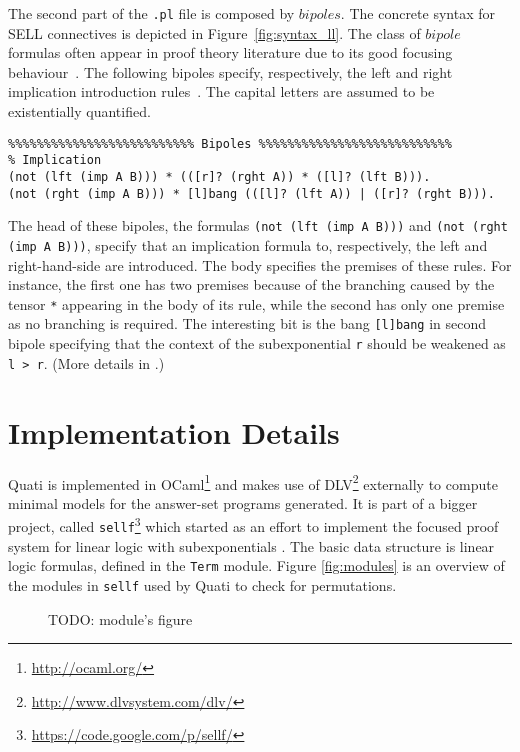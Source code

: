\documentclass{llncs}
\begin{document}
The second part of the \texttt{.pl} file is composed by $bipoles$. The concrete syntax for SELL connectives
is depicted in Figure~\ref{fig:syntax_ll}. The class of $bipole$ formulas often
appear in proof theory literature due to its good focusing
behaviour~\cite{andreoli}. The following bipoles specify, 
respectively, the left and right implication introduction rules~\cite{nigam.jlc}. The capital 
letters are assumed to be existentially quantified.

{\footnotesize
\begin{verbatim}
%%%%%%%%%%%%%%%%%%%%%%%%%% Bipoles %%%%%%%%%%%%%%%%%%%%%%%%%%%
% Implication
(not (lft (imp A B))) * (([r]? (rght A)) * ([l]? (lft B))).
(not (rght (imp A B))) * [l]bang (([l]? (lft A)) | ([r]? (rght B))).
\end{verbatim}
}

The head of these bipoles, the formulas \texttt{(not (lft (imp A B)))} and
\texttt{(not (rght (imp A B)))}, specify that an implication formula to, respectively, 
the left and right-hand-side are introduced. The body specifies the premises of these
rules. For instance, the first one has two premises because of the branching caused by the  
tensor \texttt{*} appearing in the body of its rule, while
the second has only one premise as no branching is required. 
The interesting bit is the bang \texttt{[l]bang} in second bipole specifying that the 
context of the subexponential \texttt{r} should be weakened as \texttt{l > r}. (More details
in \cite{nigam.jlc}.) 

\section{Implementation Details}

Quati is implemented in OCaml\footnote{\url{http://ocaml.org/}} and makes use of
DLV\footnote{\url{http://www.dlvsystem.com/dlv/}} externally to compute minimal models for the
answer-set programs generated. It is part of a bigger project, called
\texttt{sellf}\footnote{\url{https://code.google.com/p/sellf/}} which started as an effort to
implement the focused proof system for linear logic with subexponentials
\cite{vivek's thesis}. The basic data structure is linear logic formulas,
defined in the \texttt{Term} module. Figure \ref{fig:modules} is an overview
of the modules in \texttt{sellf} used by Quati to check for permutations.

\begin{figure}
TODO: module's figure
\end{figure}
\end{document}

